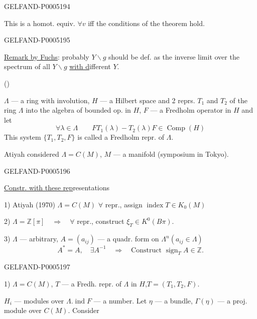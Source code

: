 \begin{GelfandAdjacentEvidence}{GELFAND-P000519}{4}


This is a homot. equiv. $\forall v$ iff the conditions of the theorem hold.
\end{GelfandAdjacentEvidence}
\begin{GelfandAdjacentEvidence}{GELFAND-P000519}{5}


\uline{Remark by Fuchs}: probably $Y\backslash g$ should be def. as the inverse limit over the spectrum of all
\underline{$Y\backslash g$} \uline{with d}ifferent $Y$.

 ()

$\Lambda$ — a ring with involution, $H$ — a Hilbert space and 2 reprs.
$T_1$ and $T_2$ of the ring $\Lambda$ into the algebra of bounded op. in $H$, $F$ — a Fredholm operator in $H$ and let
\[
\forall\lambda\in\Lambda\qquad FT_1(\lambda)-T_2(\lambda)F\in\operatorname{Comp}(H)
\]
This system $\{T_1,T_2,F\}$ is called a Fredholm repr. of $\Lambda$.

Atiyah considered $\Lambda=C(M)$, $M$ — a manifold (symposium in Tokyo).
\end{GelfandAdjacentEvidence}
\begin{GelfandAdjacentEvidence}{GELFAND-P000519}{6}


\uline{Constr. with these rep}resentations

1) Atiyah (1970) $\Lambda=C(M)$\qquad
$\forall$ repr., assign $\operatorname{index}T\in K_0(M)$

2) $\Lambda=\mathbb Z[\pi]\quad\Rightarrow\quad\forall$ repr., construct
$\xi_T\in K^0(B\pi)$.

3) $\Lambda$ — arbitrary,\qquad
$A=(a_{ij})$ — a quadr. form on $\Lambda^n$\quad $(a_{ij}\in\Lambda)$
\[
A^*=A,\quad\exists A^{-1}\quad\Rightarrow\quad
\text{Construct }\operatorname{sign}_T A\in\mathbb Z.
\]

\end{GelfandAdjacentEvidence}
\begin{GelfandAdjacentEvidence}{GELFAND-P000519}{7}

1) $\Lambda=C(M)$, $T$ — a Fredh. repr. of $\Lambda$ in $H$,\quad $T=(T_1,T_2,F)$.

$H_i$ — modules over $\Lambda$.\qquad $\operatorname{ind}F$ — a number.
Let $\eta$ — a bundle,
$\Gamma(\eta)$ — a proj. module over $C(M)$. Consider
\end{GelfandAdjacentEvidence}



